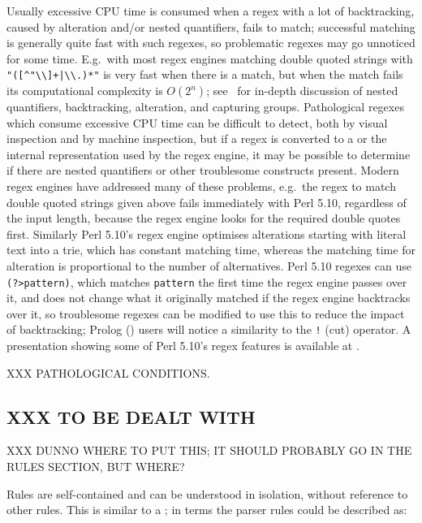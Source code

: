 Usually excessive CPU time is consumed when a regex with a lot of
backtracking, caused by alteration and/or nested quantifiers, fails to
match; successful matching is generally quite fast with such regexes, so
problematic regexes may go unnoticed for some time.  E.g.\ with most regex
engines matching double quoted strings with \verb!"([^"\\]+|\\.)*"! is very
fast when there is a match, but when the match fails its computational
complexity is $O(2^{n})$; see~\cite{mastering-regular-expressions} for
in-depth discussion of nested quantifiers, backtracking, alteration, and
capturing groups.  Pathological regexes which consume excessive CPU time
can be difficult to detect, both by visual inspection and by machine
inspection, but if a regex is converted to a  or the internal
representation used by the regex engine, it may be possible to determine if
there are nested quantifiers or other troublesome constructs present.
Modern regex engines have addressed many of these problems, e.g.\ the regex
to match double quoted strings given above fails immediately with Perl
5.10, regardless of the input length, because the regex engine looks for
the required double quotes first.  Similarly Perl 5.10's regex engine
optimises alterations starting with literal text into a trie, which has
constant matching time, whereas the matching time for alteration is
proportional to the number of alternatives.  Perl 5.10 regexes can use
\verb!(?>pattern)!, which matches \verb!pattern! the first time the regex
engine passes over it, and does not change what it originally matched if
the regex engine backtracks over it, so troublesome regexes can be modified
to use this to reduce the impact of backtracking; Prolog
()
users will notice a similarity to the \verb'!' (cut) operator.  A
presentation showing some of Perl 5.10's regex features is available at
.

XXX PATHOLOGICAL CONDITIONS\@.

\subsection{XXX TO BE DEALT WITH}

XXX DUNNO WHERE TO PUT THIS\@; IT SHOULD PROBABLY GO IN THE RULES SECTION,
BUT WHERE\@?

Rules are self-contained and can be understood in isolation, without
reference to other rules.  This is similar to a ; in
 terms the parser rules could be described as:

